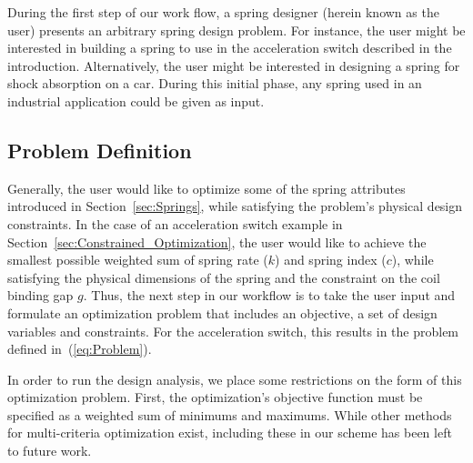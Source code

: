 \documentclass[10pt]{article}
\begin{document}
During the first step of our work flow, a spring designer (herein known as the user) presents an arbitrary spring design problem. For instance, the user might be interested in building a spring to use in the acceleration switch described in the introduction. Alternatively, the user might be interested in designing a spring for shock absorption on a car. During this initial phase, any spring used in an industrial application could be given as input.

\subsection{Problem Definition}
\label{sec:Problem_Definition}

Generally, the user would like to optimize some of the spring attributes introduced in Section~\ref{sec:Springs}, while satisfying the problem's physical design constraints. In the case of an acceleration switch example in Section~\ref{sec:Constrained_Optimization}, the user would like to achieve the smallest possible weighted sum of spring rate ($k$) and spring index ($c$), while satisfying the physical dimensions of the spring and the constraint on the coil binding gap $g$. Thus, the next step in our workflow is to take the user input and formulate an optimization problem that includes an objective, a set of design variables and constraints. For the acceleration switch, this results in the problem defined in~(\ref{eq:Problem}). 

In order to run the design analysis, we place some restrictions on the form of this optimization problem. First, the optimization's objective function must be specified as a weighted sum of minimums and maximums. While other methods for multi-criteria optimization exist, including these in our scheme has been left to future work.
\end{document}
